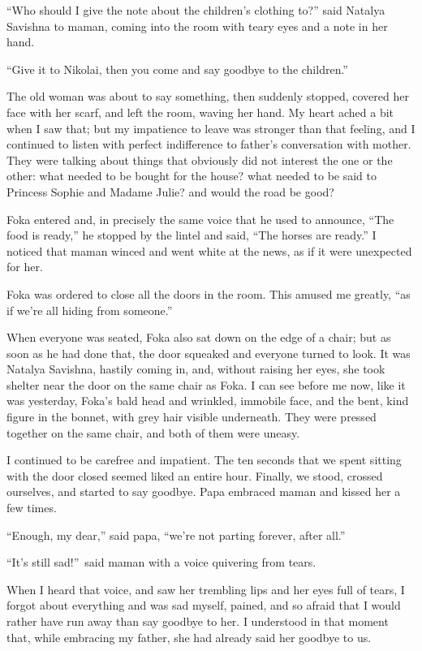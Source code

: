``Who should I give the note about the children's clothing to?'' said Natalya Savishna to maman, coming into the room with teary eyes and a note in her hand. %

``Give it to Nikolai, then you come and say goodbye to the children.''

The old woman was about to say something, then suddenly stopped, covered her face with her scarf, and left the room, waving her hand. My heart ached a bit when I saw that; but my impatience to leave was stronger than that feeling, and I continued to listen with perfect indifference to father's conversation with mother. They were talking about things that obviously did not interest the one or the other: what needed to be bought for the house? what needed to be said to Princess Sophie and Madame Julie? and would the road be good?

Foka entered and, in precisely the same voice that he used to announce, ``The food is ready,'' he stopped by the lintel and said, ``The horses are ready.'' I noticed that maman winced and went white at the news, as if it were unexpected for her. %

Foka was ordered to close all the doors in the room. This amused me greatly, ``as if we're all hiding from someone.''

When everyone was seated, Foka also sat down on the edge of a chair; but as soon as he had done that, the door squeaked and everyone turned to look. It was Natalya Savishna, hastily coming in, and, without raising her eyes, she took shelter near the door on the same chair as Foka. I can see before me now, like it was yesterday, Foka's bald head and wrinkled, immobile face, and the bent, kind figure in the bonnet, with grey hair visible underneath. They were pressed together on the same chair, and both of them were uneasy.

I continued to be carefree and impatient. The ten seconds that we spent sitting with the door closed seemed liked an entire hour. Finally, we stood, crossed ourselves, and started to say goodbye. Papa embraced maman and kissed her a few times.

``Enough, my dear,'' said papa, ``we're not parting forever, after all.'' %

``It's still sad!''~said maman with a voice quivering from tears. %

When I heard that voice, and saw her trembling lips and her eyes full of tears, I forgot about everything and was sad myself, pained, and so afraid that I would rather have run away than say goodbye to her. I understood in that moment that, while embracing my father, she had already said her goodbye to us.

